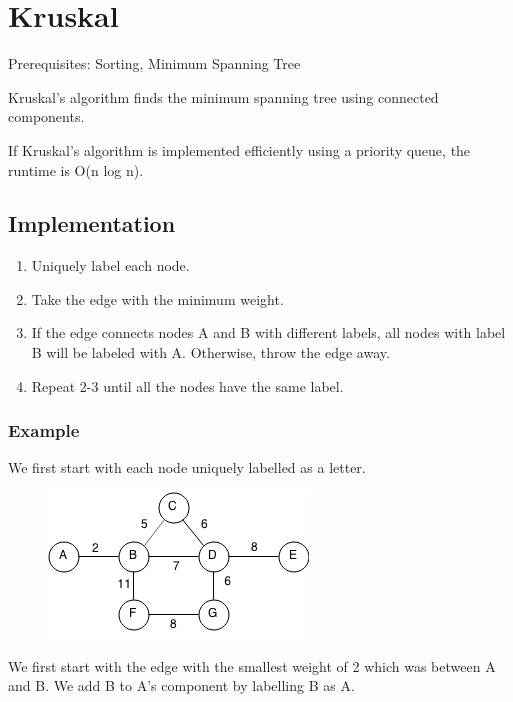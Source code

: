 \documentclass[11pt,oneside]{book}
\makeatletter
\def\maxwidth#1{\ifdim\Gin@nat@width>#1 #1\else\Gin@nat@width\fi}
\makeatother
\begin{document}
        \section{ Kruskal }
        

Prerequisites:  Sorting, Minimum Spanning Tree

Kruskal's algorithm finds the minimum spanning tree using connected components.

If Kruskal's algorithm is implemented efficiently using a priority queue, the runtime is O(n log n).

\subsection{Implementation}

\begin{enumerate}
\item Uniquely label each node.
\item Take the edge with the minimum weight.
\item If the edge connects nodes A and B with different labels, all nodes with label B will be labeled with A. Otherwise, throw the edge away.
\item Repeat 2-3 until all the nodes have the same label.
\end{enumerate}

\subsubsection{Example}

We first start with each node uniquely labelled as a letter.

\vspace{5px}\begin{figure}[H]\centering
        \includegraphics[width=0.66\maxwidth{\textwidth}]{kruskal.png}
        \end{figure}

We first start with the edge with the smallest weight of 2 which was between A and B. We add B to A's component by labelling B as A.
\end{document}
